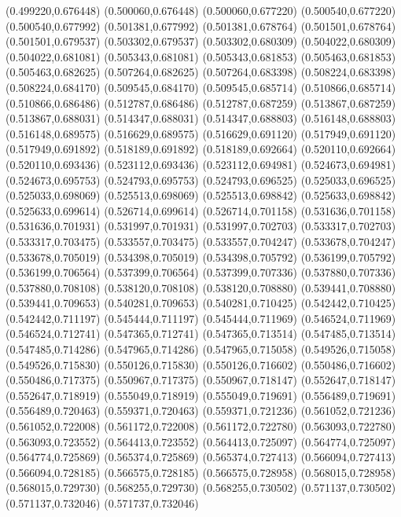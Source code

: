 (0.499220,0.676448)
(0.500060,0.676448)
(0.500060,0.677220)
(0.500540,0.677220)
(0.500540,0.677992)
(0.501381,0.677992)
(0.501381,0.678764)
(0.501501,0.678764)
(0.501501,0.679537)
(0.503302,0.679537)
(0.503302,0.680309)
(0.504022,0.680309)
(0.504022,0.681081)
(0.505343,0.681081)
(0.505343,0.681853)
(0.505463,0.681853)
(0.505463,0.682625)
(0.507264,0.682625)
(0.507264,0.683398)
(0.508224,0.683398)
(0.508224,0.684170)
(0.509545,0.684170)
(0.509545,0.685714)
(0.510866,0.685714)
(0.510866,0.686486)
(0.512787,0.686486)
(0.512787,0.687259)
(0.513867,0.687259)
(0.513867,0.688031)
(0.514347,0.688031)
(0.514347,0.688803)
(0.516148,0.688803)
(0.516148,0.689575)
(0.516629,0.689575)
(0.516629,0.691120)
(0.517949,0.691120)
(0.517949,0.691892)
(0.518189,0.691892)
(0.518189,0.692664)
(0.520110,0.692664)
(0.520110,0.693436)
(0.523112,0.693436)
(0.523112,0.694981)
(0.524673,0.694981)
(0.524673,0.695753)
(0.524793,0.695753)
(0.524793,0.696525)
(0.525033,0.696525)
(0.525033,0.698069)
(0.525513,0.698069)
(0.525513,0.698842)
(0.525633,0.698842)
(0.525633,0.699614)
(0.526714,0.699614)
(0.526714,0.701158)
(0.531636,0.701158)
(0.531636,0.701931)
(0.531997,0.701931)
(0.531997,0.702703)
(0.533317,0.702703)
(0.533317,0.703475)
(0.533557,0.703475)
(0.533557,0.704247)
(0.533678,0.704247)
(0.533678,0.705019)
(0.534398,0.705019)
(0.534398,0.705792)
(0.536199,0.705792)
(0.536199,0.706564)
(0.537399,0.706564)
(0.537399,0.707336)
(0.537880,0.707336)
(0.537880,0.708108)
(0.538120,0.708108)
(0.538120,0.708880)
(0.539441,0.708880)
(0.539441,0.709653)
(0.540281,0.709653)
(0.540281,0.710425)
(0.542442,0.710425)
(0.542442,0.711197)
(0.545444,0.711197)
(0.545444,0.711969)
(0.546524,0.711969)
(0.546524,0.712741)
(0.547365,0.712741)
(0.547365,0.713514)
(0.547485,0.713514)
(0.547485,0.714286)
(0.547965,0.714286)
(0.547965,0.715058)
(0.549526,0.715058)
(0.549526,0.715830)
(0.550126,0.715830)
(0.550126,0.716602)
(0.550486,0.716602)
(0.550486,0.717375)
(0.550967,0.717375)
(0.550967,0.718147)
(0.552647,0.718147)
(0.552647,0.718919)
(0.555049,0.718919)
(0.555049,0.719691)
(0.556489,0.719691)
(0.556489,0.720463)
(0.559371,0.720463)
(0.559371,0.721236)
(0.561052,0.721236)
(0.561052,0.722008)
(0.561172,0.722008)
(0.561172,0.722780)
(0.563093,0.722780)
(0.563093,0.723552)
(0.564413,0.723552)
(0.564413,0.725097)
(0.564774,0.725097)
(0.564774,0.725869)
(0.565374,0.725869)
(0.565374,0.727413)
(0.566094,0.727413)
(0.566094,0.728185)
(0.566575,0.728185)
(0.566575,0.728958)
(0.568015,0.728958)
(0.568015,0.729730)
(0.568255,0.729730)
(0.568255,0.730502)
(0.571137,0.730502)
(0.571137,0.732046)
(0.571737,0.732046)
